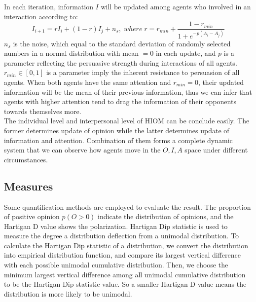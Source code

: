 \documentclass{article}
\begin{document}
In each iteration, information $I$ will be updated among agents who involved in an interaction according to:
\begin{equation}\label{eq5}
    I_{i+1} = rI_i + (1 - r)I_j + n_s,\;where\;r = r_{min} +\frac{1-r_{min}}{1+e^{-p(A_i-A_j)}}
\end{equation}
$n_s$ is the noise, which equal to the standard deviation of randomly selected numbers in a normal distribution with mean $=0$ in each update, and $p$ is a parameter reflecting the persuasive strength during interactions of all agents. $r_{min} \in [0,1]$ is a parameter imply the inherent resistance to persuasion of all agents. When both agents have the same attention and $r_{min}=0$,
their updated information will be the mean of their previous information, thus we can infer that agents with higher attention tend to drag the information of their
opponents towards themselves more.\\

The individual level and interpersonal level of HIOM can be conclude easily. The former determines update of opinion while the latter determines update of information and attention.
Combination of them forms a complete dynamic system that we can observe how agents move in the $O,I,A$ space under different circumstances.

\subsection{Measures}
Some quantification methods are employed to evaluate the result. The proportion of positive opinion $p(O>0)$ indicate the distribution of opinions, and the Hartigan D value shows the polarization. Hartigan Dip statistic is used to measure the degree a distribution deflection from a unimodal distribution.
To calculate the Hartigan Dip statistic of a distribution, we convert the distribution into empirical distribution function, and compare its largest vertical difference with each possible unimodal cumulative distribution. Then,
we choose the minimum largest vertical difference among all unimodal cumulative distribution to be the Hartigan Dip statistic value\cite{hartigan1985dip}. So a smaller Hartigan D value means the distribution is more likely to be unimodal.
\end{document}
